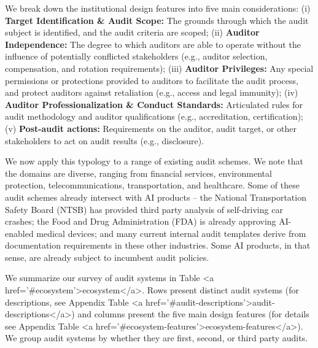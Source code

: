 \documentclass[sigconf]{acmart}
\begin{document}
We break down the institutional design features into five main considerations: (i) \textbf{Target Identification \& Audit Scope:} The grounds through which the audit subject is identified, and the audit criteria are scoped; (ii) \textbf{Auditor Independence:} The degree to which auditors are able to operate without the influence of potentially conflicted stakeholders (e.g., auditor selection, compensation, and rotation requirements); (iii) \textbf{Auditor Privileges:} Any special permissions or protections provided to auditors to facilitate the audit process, and protect auditors against retaliation (e.g., access and legal immunity); (iv) \textbf{Auditor Professionalization \& Conduct Standards:} Articulated rules for audit methodology and auditor qualifications (e.g., accreditation, certification); (v) \textbf{Post-audit actions:} Requirements on the auditor, audit target, or other stakeholders to act on audit results (e.g., disclosure). 

We now apply this typology to a range of existing audit schemes. We note that the domains are diverse, ranging from financial services, environmental protection, telecommunications, transportation, and healthcare. Some of these audit schemes already intersect with AI products -- the National Transportation Safety Board (NTSB) has provided third party analysis of self-driving car crashes; the Food and Drug Administration (FDA) is already approving AI-enabled medical devices; and many current internal audit templates derive from documentation requirements in these other industries. Some AI products, in that sense, are already subject to incumbent audit policies. 

We summarize our survey of audit systems in Table <a href='#ecosystem'>ecosystem</a>. Rows present distinct audit systems (for descriptions, see Appendix Table <a href='#audit-descriptions'>audit-descriptions</a>) and columns present the five main design features (for details see Appendix Table <a href='#ecosystem-features'>ecosystem-features</a>). We group audit systems by whether they are first, second, or third party audits.
\end{document}
